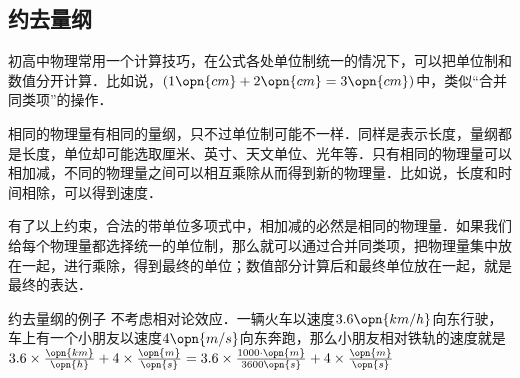 
\subsection{约去量纲}

初高中物理常用一个计算技巧，在公式各处单位制统一的情况下，可以把单位制和数值分开计算．比如说，$(1\opn{cm}+2\opn{cm}=3\opn{cm})$中，类似“合并同类项”的操作．

相同的物理量有相同的量纲，只不过单位制可能不一样．同样是表示长度，量纲都是长度，单位却可能选取厘米、英寸、天文单位、光年等．只有相同的物理量可以相加减，不同的物理量之间可以相互乘除从而得到新的物理量．比如说，长度和时间相除，可以得到速度．

有了以上约束，合法的带单位多项式中，相加减的必然是相同的物理量．如果我们给每个物理量都选择统一的单位制，那么就可以通过合并同类项，把物理量集中放在一起，进行乘除，得到最终的单位；数值部分计算后和最终单位放在一起，就是最终的表达．

\begin{example}{约去量纲的例子}
不考虑相对论效应．一辆火车以速度$3.6\opn{km/h}$向东行驶，车上有一个小朋友以速度$4\opn{m/s}$向东奔跑，那么小朋友相对铁轨的速度就是$3.6\times\frac{\opn{km}}{\opn{h}}+4\times\frac{\opn{m}}{\opn{s}}=3.6\times\frac{1000\cdot \opn{m}}{3600\opn{s}}+4\times\frac{\opn{m}}{\opn{s}}$
\end{example}


